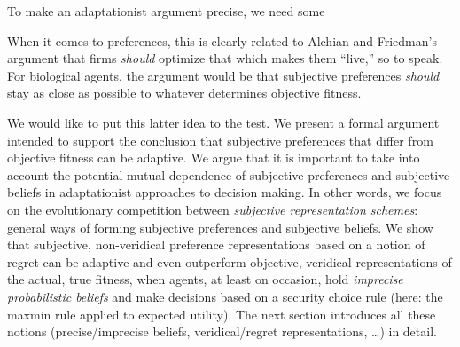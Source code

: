 \documentclass[fleqn,reqno,11pt]{article}
\begin{document}
\bigskip


 To make an adaptationist argument precise, we need
some 

 When it comes to preferences, this is clearly
related to Alchian and Friedman's argument that firms \emph{should} optimize that which makes
them ``live,'' so to speak. For biological agents, the argument would be that subjective
preferences \emph{should} stay as close as possible to whatever determines objective fitness.

We would like to put this latter idea to the test. We present a formal argument intended to
support the conclusion that subjective preferences that differ from objective fitness can be
adaptive. We argue that it is important to take into account the potential mutual dependence of
subjective preferences and subjective beliefs in adaptationist approaches to decision
making. In other words, we focus on the evolutionary competition between \emph{subjective
  representation schemes}: general ways of forming subjective preferences and
subjective beliefs. We show that subjective, non-veridical preference representations based on
a notion of regret \citep[e.g.,][]{Savage1951:The-theory-of-s,}
can be adaptive and even outperform objective, veridical representations of the actual, true
fitness, when agents, at least on occasion, hold \emph{imprecise probabilistic beliefs}
\citep[e.g.,][]{gilsch89,levi74,gardsah82} and make decisions based on a security choice rule (here: the
maxmin rule applied to expected utility). The next section introduces all these notions
(precise/imprecise beliefs, veridical/regret representations, \dots) in detail.

\end{document}
